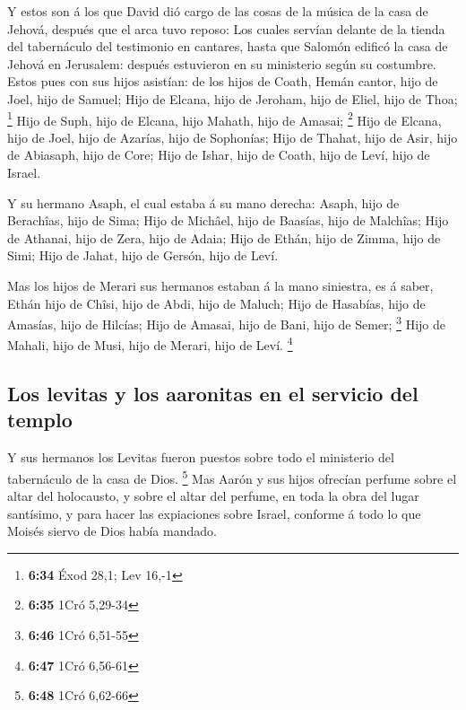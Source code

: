  Y estos son á los que David dió cargo de las cosas de la
música de la casa de Jehová, después que el arca tuvo reposo:
 Los cuales servían delante de la tienda del tabernáculo
del testimonio en cantares, hasta que Salomón edificó la casa de Jehová
en Jerusalem: después estuvieron en su ministerio según su costumbre.
 Estos pues con sus hijos asistían: de los hijos de
Coath, Hemán cantor, hijo de Joel, hijo de Samuel;  Hijo
de Elcana, hijo de Jeroham, hijo de Eliel, hijo de Thoa; \footnote{\textbf{6:34}
  Éxod 28,1; Lev 16,-1}  Hijo de Suph, hijo de Elcana,
hijo Mahath, hijo de Amasai; \footnote{\textbf{6:35} 1Cró 5,29-34}
 Hijo de Elcana, hijo de Joel, hijo de Azarías, hijo de
Sophonías;  Hijo de Thahat, hijo de Asir, hijo de
Abiasaph, hijo de Core;  Hijo de Ishar, hijo de Coath,
hijo de Leví, hijo de Israel.

 Y su hermano Asaph, el cual estaba á su mano derecha:
Asaph, hijo de Berachîas, hijo de Sima;  Hijo de Michâel,
hijo de Baasías, hijo de Malchîas;  Hijo de Athanai, hijo
de Zera, hijo de Adaia;  Hijo de Ethán, hijo de Zimma,
hijo de Simi;  Hijo de Jahat, hijo de Gersón, hijo de
Leví.

 Mas los hijos de Merari sus hermanos estaban á la mano
siniestra, es á saber, Ethán hijo de Chîsi, hijo de Abdi, hijo de
Maluch;  Hijo de Hasabías, hijo de Amasías, hijo de
Hilcías;  Hijo de Amasai, hijo de Bani, hijo de Semer;
\footnote{\textbf{6:46} 1Cró 6,51-55}  Hijo de Mahali,
hijo de Musi, hijo de Merari, hijo de Leví. \footnote{\textbf{6:47} 1Cró
  6,56-61}

\hypertarget{los-levitas-y-los-aaronitas-en-el-servicio-del-templo}{%
\subsection{Los levitas y los aaronitas en el servicio del
templo}\label{los-levitas-y-los-aaronitas-en-el-servicio-del-templo}}

 Y sus hermanos los Levitas fueron puestos sobre todo el
ministerio del tabernáculo de la casa de Dios. \footnote{\textbf{6:48}
  1Cró 6,62-66}  Mas Aarón y sus hijos ofrecían perfume
sobre el altar del holocausto, y sobre el altar del perfume, en toda la
obra del lugar santísimo, y para hacer las expiaciones sobre Israel,
conforme á todo lo que Moisés siervo de Dios había mandado.

